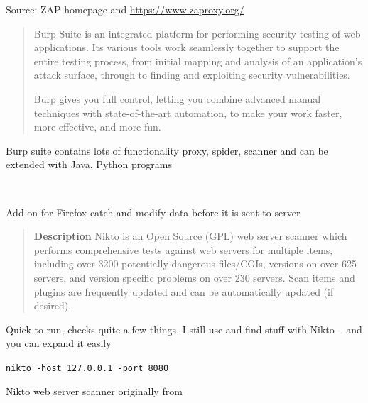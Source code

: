 \documentclass[Screen16to9,17pt]{foils}
\begin{document}
Source: ZAP homepage  and
\url{https://www.zaproxy.org/}


\begin{quote}
Burp Suite is an integrated platform for performing security testing of web applications. Its various tools work seamlessly together to support the entire testing process, from initial mapping and analysis of an application's attack surface, through to finding and exploiting security vulnerabilities.

Burp gives you full control, letting you combine advanced manual techniques with state-of-the-art automation, to make your work faster, more effective, and more fun.
\end{quote}

Burp suite contains lots of functionality proxy, spider, scanner and can be extended with Java, Python programs

\\



Add-on for Firefox catch and modify data before it is sent to server\\



\begin{quote}\small
{\bf Description}
Nikto is an Open Source (GPL) web server scanner which performs
comprehensive tests against web servers for multiple items, including
over 3200 potentially dangerous files/CGIs, versions on over 625
servers, and version specific problems on over 230 servers. Scan items
and plugins are frequently updated and can be automatically updated
(if desired).
\end{quote}

\begin{list1}
\item Quick to run, checks quite a few things. I still use and find stuff with Nikto -- and you can expand it easily
\item \verb+nikto -host 127.0.0.1 -port 8080+
\item Nikto web server scanner originally from 
\end{list1}
\end{document}
